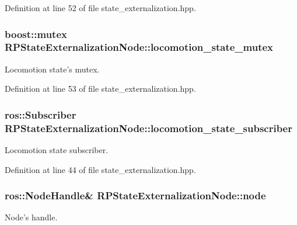 \-Definition at line 52 of file state\-\_\-externalization.\-hpp.

\hypertarget{class_r_p_state_externalization_node_a85537f2d4c8e0f0da1992b609a9ac3cf}{
\subsubsection[{locomotion\-\_\-state\-\_\-mutex}]{\setlength{\rightskip}{0pt plus 5cm}boost\-::mutex {\bf \-R\-P\-State\-Externalization\-Node\-::locomotion\-\_\-state\-\_\-mutex}}}\label{class_r_p_state_externalization_node_a85537f2d4c8e0f0da1992b609a9ac3cf}
\-Locomotion state's mutex. 

\-Definition at line 53 of file state\-\_\-externalization.\-hpp.

\hypertarget{class_r_p_state_externalization_node_a83a0b5013aaa3f576a66f5fdb0cd496e}{
\subsubsection[{locomotion\-\_\-state\-\_\-subscriber}]{\setlength{\rightskip}{0pt plus 5cm}ros\-::\-Subscriber {\bf \-R\-P\-State\-Externalization\-Node\-::locomotion\-\_\-state\-\_\-subscriber}}}\label{class_r_p_state_externalization_node_a83a0b5013aaa3f576a66f5fdb0cd496e}
\-Locomotion state subscriber. 

\-Definition at line 44 of file state\-\_\-externalization.\-hpp.

\hypertarget{class_r_p_state_externalization_node_a54542d877247b1de7128918dc9face84}{
\subsubsection[{node}]{\setlength{\rightskip}{0pt plus 5cm}ros\-::\-Node\-Handle\& {\bf \-R\-P\-State\-Externalization\-Node\-::node}}}\label{class_r_p_state_externalization_node_a54542d877247b1de7128918dc9face84}
\-Node's handle. 

